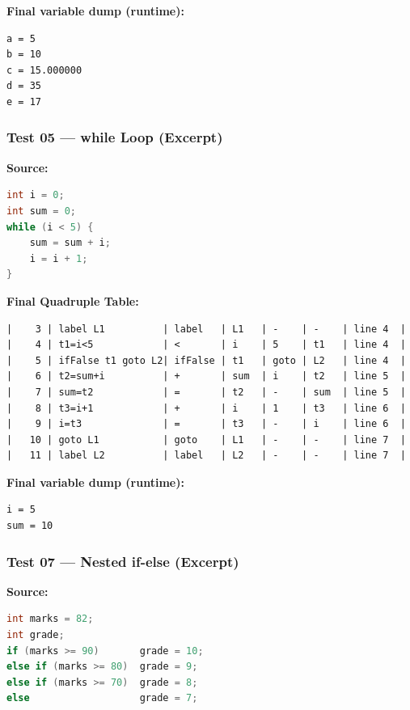 \documentclass[11pt]{article}
\begin{document}
\textbf{Final variable dump (runtime):}
\begin{lstlisting}[style=outputstyle]
a = 5
b = 10
c = 15.000000
d = 35
e = 17
\end{lstlisting}

\subsubsection{Test 05 --- while Loop (Excerpt)}

\textbf{Source:}
\begin{lstlisting}[style=cstyle, language=C]
int i = 0;
int sum = 0;
while (i < 5) {
    sum = sum + i;
    i = i + 1;
}
\end{lstlisting}

\textbf{Final Quadruple Table:}
\begin{lstlisting}[style=outputstyle]
|    3 | label L1          | label   | L1   | -    | -    | line 4  |
|    4 | t1=i<5            | <       | i    | 5    | t1   | line 4  |
|    5 | ifFalse t1 goto L2| ifFalse | t1   | goto | L2   | line 4  |
|    6 | t2=sum+i          | +       | sum  | i    | t2   | line 5  |
|    7 | sum=t2            | =       | t2   | -    | sum  | line 5  |
|    8 | t3=i+1            | +       | i    | 1    | t3   | line 6  |
|    9 | i=t3              | =       | t3   | -    | i    | line 6  |
|   10 | goto L1           | goto    | L1   | -    | -    | line 7  |
|   11 | label L2          | label   | L2   | -    | -    | line 7  |
\end{lstlisting}

\textbf{Final variable dump (runtime):}
\begin{lstlisting}[style=outputstyle]
i = 5
sum = 10
\end{lstlisting}

\subsubsection{Test 07 --- Nested if-else (Excerpt)}

\textbf{Source:}
\begin{lstlisting}[style=cstyle, language=C]
int marks = 82;
int grade;
if (marks >= 90)       grade = 10;
else if (marks >= 80)  grade = 9;
else if (marks >= 70)  grade = 8;
else                   grade = 7;
\end{lstlisting}
\end{document}
